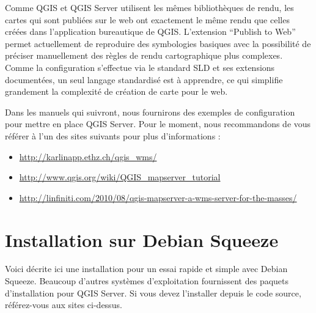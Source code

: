 Comme QGIS et QGIS Server utilisent les mêmes bibliothèques de rendu, les cartes qui sont publiées sur le web ont exactement le même rendu que celles créées dans l'application bureautique de QGIS. L'extension “Publish to Web” permet actuellement de reproduire des symbologies basiques avec la possibilité de préciser manuellement des règles de rendu cartographique plus complexes. Comme la configuration s'effectue via le standard SLD et ses extensions documentées, un seul langage standardisé est à apprendre, ce qui simplifie grandement la complexité de création de carte pour le web.

Dans les manuels qui suivront, nous fournirons des exemples de configuration pour mettre en place QGIS Server. Pour le moment, nous recommandons de vous référer à l'un des sites suivants pour plus d'informations :

\begin{itemize}
\item \url{http://karlinapp.ethz.ch/qgis\_wms/} \\
\item \url{http://www.qgis.org/wiki/QGIS\_mapserver\_tutorial} \\
\item \url{http://linfiniti.com/2010/08/qgis-mapserver-a-wms-server-for-the-masses/}
\end{itemize}

\section{Installation sur Debian Squeeze}

Voici décrite ici une installation pour un essai rapide et simple avec Debian Squeeze. Beaucoup d'autres systèmes d'exploitation fournissent des paquets d'installation pour QGIS Server. Si vous devez l'installer depuis le code source, référez-vous aux sites ci-dessus.

